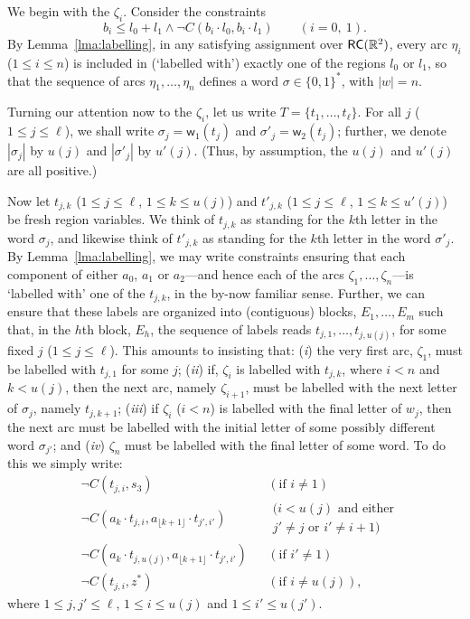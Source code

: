 \documentclass{article}
\newcommand{\R}{\mathbb{R}}
\newcommand{\RC}{{\sf RC}}
\newcommand{\fw}{\mathsf{w}}
\newcommand{\set}[1]{\{#1\}}
\begin{document}
We begin with the $\zeta_i$. Consider the constraints
\begin{equation*}
b_i \leq l_0 + l_1 \wedge \neg C(b_i \cdot l_0, b_i \cdot l_1) \qquad (i = 0,\ 1).
\end{equation*}
By Lemma~\ref{lma:labelling}, in any satisfying assignment over
$\RC(\R^2)$, every arc $\eta_i$ ($1 \leq i \leq n$) is included in
(`labelled with') exactly one of the regions $l_0$ or $l_1$, so that
the sequence of arcs $\eta_1, \ldots, \eta_n$ defines a word $\sigma
\in \set{0,1}^*$, with $|w| = n$.

Turning our attention now to the $\zeta_i$, let us write $T =
\set{t_1, \ldots, t_\ell}$. For all $j$ ($1 \leq j \leq \ell$), we
shall write $\sigma_j = \fw_1(t_j)$ and $\sigma'_j = \fw_2(t_j)$;
further, we denote $|\sigma_j|$ by $u(j)$ and $|\sigma'_j|$ by
$u'(j)$. (Thus, by assumption, the $u(j)$ and $u'(j)$ are all
positive.)

Now let $t_{j,k}$ ($1 \leq j \leq \ell$, $1 \leq k \leq u(j)$) and
$t'_{j,k}$ ($1 \leq j \leq \ell$, $1 \leq k \leq u'(j)$) be fresh
region variables.  We think of $t_{j,k}$ as standing for the $k$th
letter in the word $\sigma_j$, and likewise think of $t'_{j,k}$ as
standing for the $k$th letter in the word $\sigma'_j$.  By
Lemma~\ref{lma:labelling}, we may write constraints ensuring that each
component of either $a_0$, $a_1$ or $a_2$---and hence each of the arcs
$\zeta_1, \ldots, \zeta_n$---is `labelled with' one of the $t_{j,k}$,
in the by-now familiar sense.  Further, we can ensure that these
labels are organized into (contiguous) blocks, $E_1, \ldots, E_{m}$
such that, in the $h$th block, $E_h$, the sequence of labels reads
$t_{j,1}, \ldots, t_{j,{u(j)}}$, for some fixed $j$ ($1 \leq j \leq
\ell$).  This amounts to insisting that: ({\em i}) the very first arc,
$\zeta_1$, must be labelled with $t_{j,1}$ for some $j$; ({\em ii})
if, $\zeta_i$ is labelled with $t_{j,k}$, where $i < n$ and $k <
u(j)$, then the next arc, namely $\zeta_{i+1}$, must be labelled with
the next letter of $\sigma_j$, namely $t_{j,k+1}$; ({\em iii}) if
$\zeta_i$ ($i < n$) is labelled with the final letter of $w_j$, then
the next arc must be labelled with the initial letter of some possibly
different word $\sigma_{j'}$; and ({\em iv}) $\zeta_n$ must be
labelled with the final letter of some word. To do this we simply
write:
\begin{align*}
& \neg C(t_{j,i}, s_3) & & (\mbox{if } i \neq 1)\\
& \neg C(a_k \cdot t_{j,i}, a_{\lfloor k+1 \rfloor} \cdot t_{j',i'}) & &
\begin{array}{l}
\text{($i < u(j)$ and either}\\
\text{$j' \neq j$ or $i' \neq i+1$)}
\end{array}\\
& \neg C(a_k \cdot t_{j,u(j)}, a_{\lfloor k+1 \rfloor} \cdot t_{j',i'}) & &
(\mbox{if } i' \neq 1)\\
& \neg C(t_{j,i}, z^*) & & (\mbox{if } i \neq u(j)),
\end{align*}
where $1 \leq j, j' \leq \ell$, $1 \leq i \leq u(j)$ and $1\leq i'
\leq u(j')$.
\end{document}
